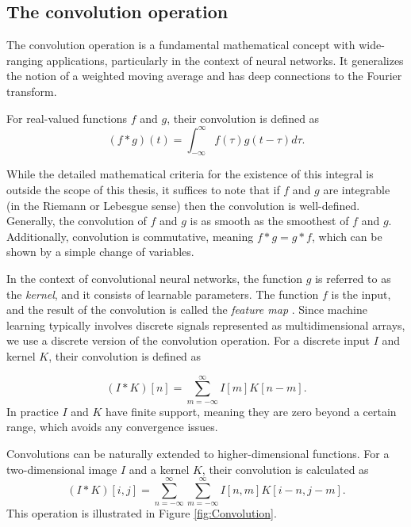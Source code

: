 \documentclass[../../thesis.tex]{subfiles}
\begin{document}
\subsection{The convolution operation}

The convolution operation is a fundamental mathematical concept with wide-ranging applications, particularly in the context of neural networks. It generalizes the notion of a weighted moving average and has deep connections to the Fourier transform.\newline

For real-valued functions $f$ and $g$, their convolution is defined as
\begin{equation}
    (f*g)(t) = \int_{-\infty}^{\infty} f(\tau)g(t-\tau) d\tau.
\end{equation}

While the detailed mathematical criteria for the existence of this integral is outside the scope of this thesis, it suffices to note that if $f$ and $g$ are integrable (in the Riemann or Lebesgue sense) then the convolution is well-defined. Generally, the convolution of $f$ and $g$ is as smooth as the smoothest of $f$ and $g$. Additionally, convolution is commutative, meaning $f*g = g*f$, which can be shown by a simple change of variables. \newline

In the context of convolutional neural networks, the function $g$ is referred to as the \textit{kernel}, and it consists of learnable parameters. The function $f$ is the input, and the result of the convolution is called the \textit{feature map} \cite{deeplearningbook}. Since machine learning typically involves discrete signals represented as multidimensional arrays, we use a discrete version of the convolution operation. For a discrete input $I$ and kernel $K$, their convolution is defined as

\begin{equation}
    (I*K)[n] = \sum_{m=-\infty}^{\infty} I[m]K[n-m].
\end{equation}
In practice $I$ and $K$ have finite support, meaning they are zero beyond a certain range, which avoids any convergence issues.\newline

Convolutions can be naturally extended to higher-dimensional functions. For a two-dimensional image $I$ and a kernel $K$, their convolution is calculated as 
\begin{equation}
    (I*K)[i,j] = \sum_{n=-\infty}^{\infty}\sum_{m=-\infty}^{\infty} I[n,m]K[i - n,j - m]. 
\end{equation}
This operation is illustrated in Figure \ref{fig:Convolution}.\newline
\end{document}
